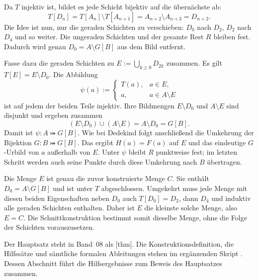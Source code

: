 Da \(T\) injektiv ist, bildet es jede Schicht bijektiv auf die
übernächste ab:
\[
  T[D_n]=T[A_n]\setminus T[A_{n+1}]
        =A_{n+2}\setminus A_{n+3}=D_{n+2}.
\]
Die Idee ist nun, nur die geraden Schichten zu verschieben:
\(D_0\) nach \(D_2\), \(D_2\) nach \(D_4\) und so weiter.
Die ungeraden Schichten und der gesamte Rest \(R\) bleiben fest.
Dadurch wird genau \(D_0=A\setminus G[B]\) aus dem Bild entfernt.

Fasse dazu die geraden Schichten zu
\(E:=\bigcup_{k\geq0}D_{2k}\) zusammen. Es gilt
\(T[E]=E\setminus D_0\). Die Abbildung
\[
  \psi(a):=\begin{cases}
    T(a),&a\in E,\\
    a,&a\in A\setminus E
  \end{cases}
\]
ist auf jedem der beiden Teile injektiv. Ihre Bildmengen
\(E\setminus D_0\) und \(A\setminus E\) sind disjunkt und
ergeben zusammen
\[
  (E\setminus D_0)\cup(A\setminus E)
    =A\setminus D_0=G[B].
\]
Damit ist \(\psi\colon A\bij G[B]\).
Wie bei Dedekind folgt anschließend die Umkehrung der Bijektion
\(G\colon B\bij G[B]\). Das ergibt \(H(a)=F(a)\) auf \(E\)
und das eindeutige \(G\)-Urbild von \(a\) außerhalb von \(E\).
Unter \(\psi\) bleibt \(R\) punktweise fest; im letzten Schritt
werden auch seine Punkte durch diese Umkehrung nach \(B\) übertragen.

Die Menge \(E\) ist genau die zuvor konstruierte Menge \(C\).
Sie enthält \(D_0=A\setminus G[B]\) und ist unter \(T\)
abgeschlossen. Umgekehrt muss jede Menge mit diesen beiden Eigenschaften
neben \(D_0\) auch \(T[D_0]=D_2\), dann \(D_4\) und induktiv
alle geraden Schichten enthalten. Daher ist \(E\) die kleinste
solche Menge, also \(E=C\). Die Schnittkonstruktion bestimmt somit
dieselbe Menge, ohne die Folge der Schichten vorauszusetzen.

Der Hauptsatz steht in Band~08 als
[thm].
Die Konstruktionsdefinition, die Hilfssätze und sämtliche formalen
Ableitungen stehen im ergänzenden Skript \CSBProofsLink{}.
Dessen Abschnitt \CSBMainProofLink{} führt die Hilfsergebnisse
zum Beweis des Hauptsatzes zusammen.
